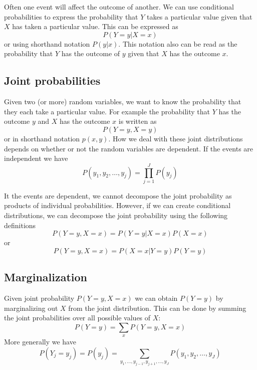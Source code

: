 Often one event will affect the outcome of another.
We can use conditional probabilities to express the probability that $Y$
takes a particular value given that $X$ has taken a particular value.
This can be expressed as
\begin{equation}
P(Y=y | X=x)
\end{equation}
or using shorthand notation $P(y|x)$.
This notation also can be read as the probability that $Y$ has the outcome of $y$ given
that $X$ has the outcome $x$.


\subsection{Joint probabilities}

Given two (or more) random variables, we want to know the probability that they each take a particular
value. For example the probability that $Y$ has the outcome $y$ and $X$ has the outcome $x$ is
written as
\begin{equation}
P(Y=y,X=y)
\end{equation}
or in shorthand notation $p(x,y)$. How we deal with these joint distributions depends on whether
or not the random variables are dependent. If the events are independent we have
\begin{equation}
P(y_1,y_2,\ldots,y_j) = \prod_{j=1}^{J} P(y_j)
\end{equation}

It the events are dependent, we cannot decompose the joint probability as products of
individual probabilities. However, if we can create conditional distributions, we can
decompose the joint probability using the following definitions
\begin{equation}
P(Y=y,X=x) = P(Y=y|X=x) P(X=x)
\end{equation}
or
\begin{equation}
P(Y=y,X=x) = P(X=x|Y=y) P(Y=y)
\end{equation}

\subsection{Marginalization}

Given joint probability $P(Y=y,X=x)$ we can obtain $P(Y=y)$ by marginalizing out $X$ from the
joint distribution. This can be done by summing the joint probabilities over all
possible values of $X$:
\begin{equation}
P(Y=y) = \sum_{x} P(Y=y,X=x)
\end{equation}
More generally we have
\begin{equation}
P(Y_j=y_j) = P(y_j) = \sum_{y_1,\ldots,y_{j-1},y_{j+1},\ldots,y_{J}}
P(y_1,y_2,\ldots,y_{J})
\end{equation}

